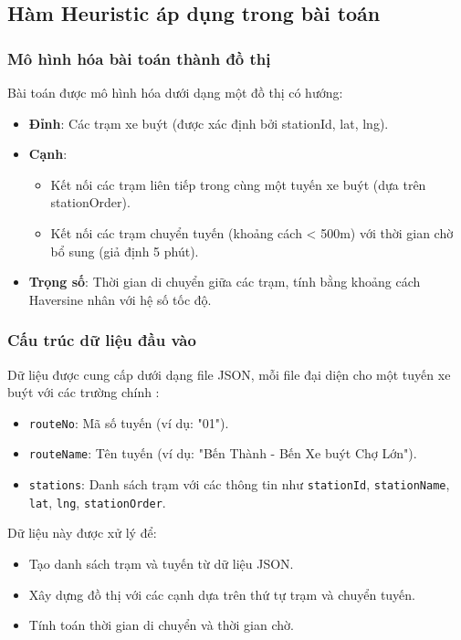 \documentclass[a4paper,12pt]{article}
\begin{document}
\subsection{Hàm Heuristic áp dụng trong bài toán}

\subsubsection{Mô hình hóa bài toán thành đồ thị}

Bài toán được mô hình hóa dưới dạng một đồ thị có hướng:
\begin{itemize}
    \item \textbf{Đỉnh}: Các trạm xe buýt (được xác định bởi stationId, lat, lng).
    \item \textbf{Cạnh}:
    \begin{itemize}
        \item Kết nối các trạm liên tiếp trong cùng một tuyến xe buýt (dựa trên stationOrder).
        \item Kết nối các trạm chuyển tuyến (khoảng cách < 500m) với thời gian chờ bổ sung (giả định 5 phút).
    \end{itemize}
    \item \textbf{Trọng số}: Thời gian di chuyển giữa các trạm, tính bằng khoảng cách Haversine nhân với hệ số tốc độ.
\end{itemize}

\subsubsection{Cấu trúc dữ liệu đầu vào}

Dữ liệu được cung cấp dưới dạng file JSON, mỗi file đại diện cho một tuyến xe buýt với các trường chính \cite{busplan}:
\begin{itemize}
    \item \texttt{routeNo}: Mã số tuyến (ví dụ: "01").
    \item \texttt{routeName}: Tên tuyến (ví dụ: "Bến Thành - Bến Xe buýt Chợ Lớn").
    \item \texttt{stations}: Danh sách trạm với các thông tin như \texttt{stationId}, \texttt{stationName}, \texttt{lat}, \texttt{lng}, \texttt{stationOrder}.
\end{itemize}
Dữ liệu này được xử lý để:
\begin{itemize}
    \item Tạo danh sách trạm và tuyến từ dữ liệu JSON.
    \item Xây dựng đồ thị với các cạnh dựa trên thứ tự trạm và chuyển tuyến.
    \item Tính toán thời gian di chuyển và thời gian chờ.
\end{itemize}
\end{document}
